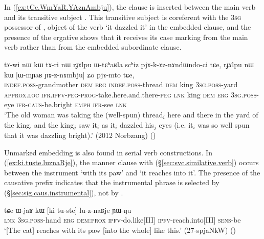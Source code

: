 In (\ref{ex:tCe.WmYaR.YAznAmbju}), the clause  is inserted between the main verb  and its transitive subject . This transitive subject is coreferent with the \textsc{3sg} possessor of , object of the verb  `it dazzled it' in the embedded clause, and the presence of the ergative  shows that it receives its case marking from the main verb rather than from the embedded subordinate clause.  
 
\begin{exe}
\ex \label{ex:tCe.WmYaR.YAznAmbju}
\gll tɤ-wi nɯ kɯ tɤ-ri nɯ rɟɤlpu ɯ-tɕʰaʁla scʰiz pjɤ-k-ɤz-nɤndɯndo-ci tɕe, rɟɤlpu nɯ kɯ [ɯ-mɲaʁ ɲɤ-z-nɤmbju] ʑo pjɤ-mto tɕe,  \\
\textsc{indef}.\textsc{poss}-grandmother \textsc{dem} \textsc{erg} \textsc{indef}.\textsc{poss}-thread \textsc{dem} king \textsc{3sg}.\textsc{poss}-yard \textsc{approx}.\textsc{loc} \textsc{ifr}.\textsc{ipfv}-\textsc{peg}-\textsc{prog}-take.here.and.there-\textsc{peg} \textsc{lnk} king  \textsc{dem} \textsc{erg} \textsc{3sg}.\textsc{poss}-eye \textsc{ifr}-\textsc{caus}-be.bright \textsc{emph} \textsc{ifr}-see \textsc{lnk} \\
\glt `The old woman was taking the (well-spun) thread$_i$ here and there in the yard of the king, and the king$_j$ saw it$_i$ as it$_i$ dazzled his$_j$ eyes (i.e. it$_i$ was so well spun that it was dazzling bright).'  (2012 Norbzang)
()
\end{exe} 


Unmarked embedding is also found in serial verb constructions. In (\ref{ex:ki.tuste.luznaRje}), the manner clause with  (§\ref{sec:svc.similative.verb}) occurs between the instrument  `with its paw' and  `it reaches into it'. The presence of the causative prefix  indicates that the instrumental phrase is selected by  (§\ref{sec:sig.caus.instrumental}), not by .

\begin{exe}
\ex \label{ex:ki.tuste.luznaRje}
 \gll tɕe ɯ-jaʁ kɯ [ki tu-ste] lu-z-naʁje ɲɯ-ŋu  \\
 \textsc{lnk} \textsc{3sg}.\textsc{poss}-hand \textsc{erg} \textsc{dem}:\textsc{prox} \textsc{ipfv}-do.like[III]  \textsc{ipfv}-reach.into[III] \textsc{sens}-be   \\
\glt `[The cat] reaches with its paw [into the whole] like this.' (27-spjaNkW)
()
\end{exe}

